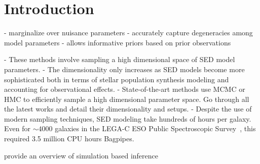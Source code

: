 \section{Introduction} \label{sec:intro} 


- marginalize over nuisance parameters
- accurately capture degeneracies among model parameters
- allows informative priors based on prior observations

- These methods involve sampling a high dimensional space of SED model
parameters. 
- The dimensionality only increases as SED models become more sophisticated
both in terms of stellar population synthesis modeling and accounting for
observational effects.  
- State-of-the-art methods use MCMC or HMC to efficiently sample a high
dimensional parameter space. Go through all the latest works and detail their
dimensionality and setups. 
- Despite the use of modern sampling techniques, SED modeling take hundreds of
hours per galaxy. Even for $\sim 4000$ galaxies in the LEGA-C ESO Public
Spectroscopic Survey~\cite{}, this required 3.5 million CPU hours {\sc
Bagpipes}. 

provide an overview of simulation based inference 
